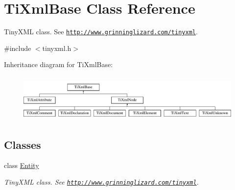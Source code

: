 \hypertarget{class_ti_xml_base}{}\section{Ti\+Xml\+Base Class Reference}
\label{class_ti_xml_base}


Tiny\+X\+ML class. See \href{http://www.grinninglizard.com/tinyxml}{\tt http\+://www.\+grinninglizard.\+com/tinyxml}.  




{\ttfamily \#include $<$tinyxml.\+h$>$}

Inheritance diagram for Ti\+Xml\+Base\+:\begin{figure}[H]
\begin{center}
\leavevmode
\includegraphics[height=2.413793cm]{class_ti_xml_base}
\end{center}
\end{figure}
\subsection*{Classes}
\begin{DoxyCompactItemize}
\item 
class \hyperlink{struct_ti_xml_base_1_1_entity}{Entity}
\begin{DoxyCompactList}\small\item\em Tiny\+X\+ML class. See \href{http://www.grinninglizard.com/tinyxml}{\tt http\+://www.\+grinninglizard.\+com/tinyxml}. \end{DoxyCompactList}\end{DoxyCompactItemize}
